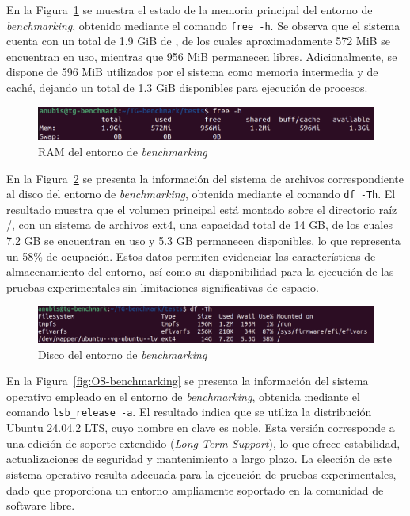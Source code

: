 \noindent
En la Figura~\ref{fig:RAM-benchmarking} se muestra el estado de la memoria principal del entorno de \textit{benchmarking}, obtenido mediante el comando \texttt{free -h}. Se observa que el sistema cuenta con un total de 1.9 GiB de \RAM, de los cuales aproximadamente 572 MiB se encuentran en uso, mientras que 956 MiB permanecen libres. Adicionalmente, se dispone de 596 MiB utilizados por el sistema como memoria intermedia y de caché, dejando un total de 1.3 GiB disponibles para ejecución de procesos.
\begin{figure}[H]
    \centering
    \includegraphics[width=\textwidth,height=0.85\textheight,keepaspectratio]{apendices/ENV-BENCH/RAM.png}
    \caption{RAM del entorno de \textit{benchmarking}}\label{fig:RAM-benchmarking}
\end{figure}
\noindent
En la Figura~\ref{fig:DISK-benchmarking} se presenta la información del sistema de archivos correspondiente al disco del entorno de \textit{benchmarking}, obtenida mediante el comando \texttt{df -Th}. El resultado muestra que el volumen principal está montado sobre el directorio raíz /, con un sistema de archivos ext4, una capacidad total de 14 GB, de los cuales 7.2 GB se encuentran en uso y 5.3 GB permanecen disponibles, lo que representa un 58\% de ocupación. Estos datos permiten evidenciar las características de almacenamiento del entorno, así como su disponibilidad para la ejecución de las pruebas experimentales sin limitaciones significativas de espacio.
\begin{figure}[H]
    \centering
    \includegraphics[width=\textwidth,height=0.85\textheight,keepaspectratio]{apendices/ENV-BENCH/DISCO.png}
    \caption{Disco del entorno de \textit{benchmarking}}\label{fig:DISK-benchmarking}
\end{figure}
\noindent
En la Figura~\ref{fig:OS-benchmarking} se presenta la información del sistema operativo empleado en el entorno de \textit{benchmarking}, obtenida mediante el comando \texttt{lsb\_release -a}. El resultado indica que se utiliza la distribución Ubuntu 24.04.2 LTS, cuyo nombre en clave es noble. Esta versión corresponde a una edición de soporte extendido (\textit{Long Term Support}), lo que ofrece estabilidad, actualizaciones de seguridad y mantenimiento a largo plazo. La elección de este sistema operativo resulta adecuada para la ejecución de pruebas experimentales, dado que proporciona un entorno ampliamente soportado en la comunidad de software libre.
